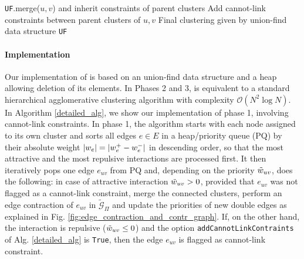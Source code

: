 {\begin{algorithm*}[p]
\begin{algorithmic}[1]
           
              
              \State \texttt{UF}.merge($u,v$) and inherit constraints of parent clusters
              \State Add cannot-link constraints between parent clusters of $u,v$
            \EndIf
          \EndIf
        \EndFor
        \State
        \Return Final clustering given by union-find data structure \texttt{UF}
    \end{algorithmic}
    \label{alg:mutex_watershed}
  \end{algorithm*}
  \clearpage
}

\paragraph{Implementation} Our implementation of \algname{} is based on an union-find data structure and a heap allowing deletion of its elements. 
In Phases 2 and 3, \algname{} is equivalent to a standard hierarchical agglomerative clustering algorithm with complexity $\mathcal{O}(N^2 \log N)$. In Algorithm \ref{detailed_alg}, we show our implementation of phase 1, involving cannot-link constraints.
In phase 1, the algorithm starts with each node assigned to its own cluster and sorts all edges $e\in E$ in a heap/priority queue (PQ) by their absolute weight $|w_e|=|w_e^+ - w_e^-|$ in descending order, so that the most attractive and the most repulsive interactions are processed first. It then iteratively pops one edge $e_{uv}$ from PQ and, depending on the priority $\tilde{w}_{uv}$, does the following: in case of attractive interaction $\tilde{w}_{uv}>0$, provided that $e_{uv}$ was not flagged as a cannot-link constraint, merge the connected clusters, perform an edge contraction of $e_{uv}$ in $\tilde{\mathcal{G}}_\Pi$ and update the priorities of new double edges as explained in Fig. \ref{fig:edge_contraction_and_contr_graph}. 
If, on the other hand, the interaction is repulsive ($\tilde{w}_{uv}\leq 0$) and the option \texttt{addCannotLinkContraints} of Alg. \ref{detailed_alg} is \texttt{True}, then the edge $e_{uv}$ is flagged as cannot-link constraint.


